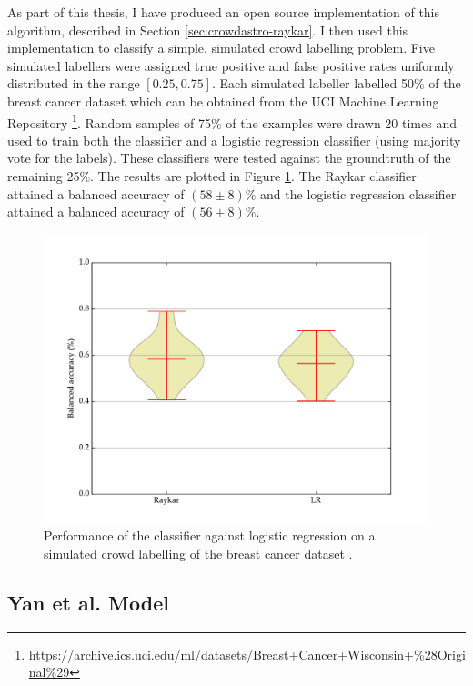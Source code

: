            As part of this thesis, I have produced an open source implementation of this algorithm, described in Section \ref{sec:crowdastro-raykar}. I then used this implementation to classify a simple, simulated crowd labelling problem. Five simulated labellers were assigned true positive and false positive rates uniformly distributed in the range $[0.25, 0.75]$. Each simulated labeller labelled 50\% of the breast cancer dataset \citep{wolberg90} which can be obtained from the UCI Machine Learning Repository \citep{lichman13}\footnote{\url{https://archive.ics.uci.edu/ml/datasets/Breast+Cancer+Wisconsin+\%28Original\%29}}. Random samples of 75\% of the examples were drawn 20 times and used to train both the \citeauthor{raykar10} classifier and a logistic regression classifier (using majority vote for the labels). These classifiers were tested against the groundtruth of the remaining 25\%. The results are plotted in Figure \ref{fig:raykar}. The Raykar classifier attained a balanced accuracy of $(58 \pm 8)\%$ and the logistic regression classifier attained a balanced accuracy of $(56 \pm 8)\%$.

            \begin{figure}[!ht]
                \centering
                \includegraphics[width=\textwidth]{images/experiments/raykar.pdf}
                \caption{Performance of the \citeauthor{raykar10} classifier against logistic regression on a simulated crowd labelling of the breast cancer dataset \citep{wolberg90}.}
                \label{fig:raykar}
            \end{figure}

    \subsection{Yan et al. Model}
    \label{sec:yan}

